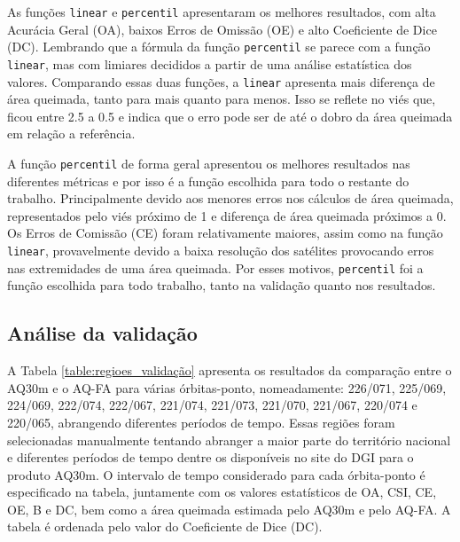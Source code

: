 \documentclass[cic,tc]{iiufrgs}
\begin{document}
As funções \texttt{linear} e \texttt{percentil} apresentaram os melhores resultados, com alta Acurácia Geral (OA), baixos Erros de Omissão (OE) e alto Coeficiente de Dice (DC). Lembrando que a fórmula da função \texttt{percentil} se parece com a função \texttt{linear}, mas com limiares decididos a partir de uma análise estatística dos valores. Comparando essas duas funções, a \texttt{linear} apresenta mais diferença de área queimada, tanto para mais quanto para menos. Isso se reflete no viés que, ficou entre 2.5 a 0.5 e indica que o erro pode ser de até o dobro da área queimada em relação a referência.

A função \texttt{percentil} de forma geral apresentou os melhores resultados nas diferentes métricas e por isso é a função escolhida para todo o restante do trabalho. Principalmente devido aos menores erros nos cálculos de área queimada, representados pelo viés próximo de 1 e diferença de área queimada próximos a 0. Os Erros de Comissão (CE) foram relativamente maiores, assim como na função \texttt{linear}, provavelmente devido a baixa resolução dos satélites provocando erros nas extremidades de uma área queimada. Por esses motivos, \texttt{percentil} foi a função escolhida para todo trabalho, tanto na validação quanto nos resultados.

\subsection*{Análise da validação}

A Tabela \ref{table:regioes_validação} apresenta os resultados da comparação entre o AQ30m e o AQ-FA para várias órbitas-ponto, nomeadamente: 226/071, 225/069, 224/069, 222/074, 222/067, 221/074, 221/073, 221/070, 221/067, 220/074 e 220/065, abrangendo diferentes períodos de tempo. Essas regiões foram selecionadas manualmente tentando abranger a maior parte do território nacional e diferentes períodos de tempo dentre os disponíveis no site do DGI para o produto AQ30m. O intervalo de tempo considerado para cada órbita-ponto é especificado na tabela, juntamente com os valores estatísticos de OA, CSI, CE, OE, B e DC, bem como a área queimada estimada pelo AQ30m e pelo AQ-FA. A tabela é ordenada pelo valor do Coeficiente de Dice (DC).
\end{document}
